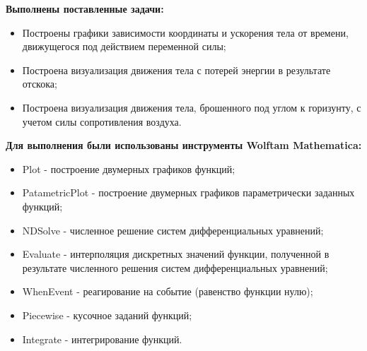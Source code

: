 \textbf{Выполнены поставленные задачи:}
\begin{itemize}
    \item Построены графики зависимости координаты и ускорения тела от времени, движущегося под действием переменной силы;
    \item Построена визуализация движения тела с потерей энергии в результате отскока;
    \item Построена визуализация движения тела, брошенного под углом к горизунту, с учетом силы сопротивления воздуха.
\end{itemize}

\textbf{Для выполнения были использованы инструменты Wolftam Mathematica:}
\begin{itemize}
    \item Plot - построение двумерных графиков функций;
    \item PatametricPlot - построение двумерных графиков параметрически заданных функций;
    \item NDSolve - численное решение систем дифференциальных уравнений;
    \item Evaluate - интерполяция дискретных значений функции, полученной в результате численного решения систем дифференциальных уравнений;
    \item WhenEvent - реагирование на событие (равенство функции нулю);
    \item Piecewise - кусочное заданий функций;
    \item Integrate - интегрирование функций.
\end{itemize}


